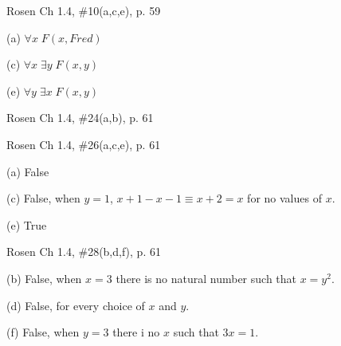 \documentclass[12pt]{exam}
\newenvironment{my_parts}{
\begin{parts}
    \setlength{\itemsep}{1pt}
    \setlength{\parskip}{0pt}
    \setlength{\parsep}{0pt}
}{\end{parts}}
\newenvironment{my_item}{
\begin{itemize}
    \setlength{\itemsep}{1pt}
    \setlength{\parskip}{0pt}
    \setlength{\parsep}{0pt}
}{\end{itemize}}
\begin{document}
\begin{questions}
\question[9] Rosen Ch 1.4, \#10(a,c,e), p. 59
    \begin{solution}
    \begin{my_item}
        \item[(a)] $\forall x\; F(x, Fred)$
        \item[(c)] $\forall x\; \exists y\; F(x,y)$
        \item[(e)] $\forall y\; \exists x\; F(x,y)$
    \end{my_item}
    \end{solution}


\question[6] Rosen Ch 1.4, \#24(a,b), p. 61
    \begin{solution}
    \end{solution}


\question[9] Rosen Ch 1.4, \#26(a,c,e), p. 61
    \begin{solution}
    \begin{my_item}
        \item[(a)]  False
        \item[(c)]  False, when $y=1$, $x + 1 - x-1 \equiv x + 2 =
        x$ for no values of $x$.
        \item[(e)] True
    \end{my_item}
    \end{solution}


\question[9] Rosen Ch 1.4, \#28(b,d,f), p. 61
    \begin{solution}
    \begin{my_item}
        \item[(b)] False, when $x=3$ there is no natural number such that $x = y^2$.
        \item[(d)] False, for every choice of $x$ and $y$.
        \item[(f)] False, when $y=3$ there i no $x$ such that $3x = 1$.
    \end{my_item}
    \end{solution}



\end{questions}
\end{document}
